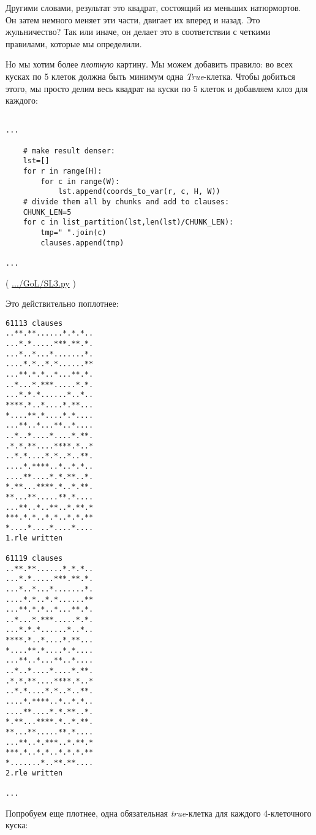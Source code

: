 Другими словами, результат это квадрат, состоящий из меньших натюрмортов.
Он затем немного меняет эти части, двигает их вперед и назад.
Это жульничество?
Так или иначе, он делает это в соответствии с четкими правилами, которые мы определили.

Но мы хотим более \textit{плотную} картину. Мы можем добавить правило: во всех кусках по 5 клеток должна быть
минимум одна \textit{True}-клетка.
Чтобы добиться этого, мы просто делим весь квадрат на куски по 5 клеток и добавляем клоз для каждого:

\begin{lstlisting}

...

    # make result denser:
    lst=[]
    for r in range(H):
        for c in range(W):
            lst.append(coords_to_var(r, c, H, W))
    # divide them all by chunks and add to clauses:
    CHUNK_LEN=5
    for c in list_partition(lst,len(lst)/CHUNK_LEN):
        tmp=" ".join(c)
        clauses.append(tmp)

...

\end{lstlisting}

( \url{.../GoL/SL3.py} )

Это действительно поплотнее:

\begin{lstlisting}
61113 clauses
..**.**......*.*.*..
...*.*.....***.**.*.
...*..*...*.......*.
....*.*..*.*......**
...**.*.*..*...**.*.
..*...*.***.....*.*.
...*.*.*......*..*..
****.*..*....*.**...
*....**.*....*.*....
...**..*...**..*....
..*..*....*....*.**.
.*.*.**....****.*..*
..*.*....*.*..*..**.
....*.****..*..*.*..
....**....*.*.**..*.
*.**...****.*..*.**.
**...**.....**.*....
...**..*..**..*.**.*
***.*.*..*.*..*.*.**
*....*....*....*....
1.rle written

61119 clauses
..**.**......*.*.*..
...*.*.....***.**.*.
...*..*...*.......*.
....*.*..*.*......**
...**.*.*..*...**.*.
..*...*.***.....*.*.
...*.*.*......*..*..
****.*..*....*.**...
*....**.*....*.*....
...**..*...**..*....
..*..*....*....*.**.
.*.*.**....****.*..*
..*.*....*.*..*..**.
....*.****..*..*.*..
....**....*.*.**..*.
*.**...****.*..*.**.
**...**.....**.*....
...**..*.***..*.**.*
***.*..*.*..*.*.*.**
*.......*..**.**....
2.rle written

...

\end{lstlisting}

Попробуем еще плотнее, одна обязательная \textit{true}-клетка для каждого 4-клеточного куска:

